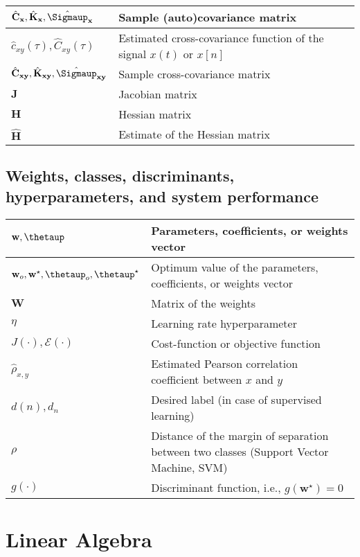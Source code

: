 \documentclass{article}
\begin{document}
\begin{xltabular}{\textwidth}{XX}
    \(\hat{\mathbf{C}}_\mathbf{x}, \hat{\mathbf{K}}_\mathbf{x}, \hat{\boldsymbol{\Sigmaup}}_\mathbf{x}\) & Sample (auto)covariance matrix \\ \hline
    \(\hat{c}_{xy}(\tau), \hat{C}_{xy}(\tau)\) & Estimated cross-covariance function of the signal \(x(t)\) or \(x[n]\)\\ \hline
    \(\hat{\mathbf{C}}_{\mathbf{xy}}, \hat{\mathbf{K}}_{\mathbf{xy}}, \hat{\boldsymbol{\Sigmaup}}_{\mathbf{xy}}\) & Sample cross-covariance matrix \\ \hline
    \(\mathbf{J}\) & Jacobian matrix\\ \hline
    \(\mathbf{H}\) & Hessian matrix \\ \hline
    \(\hat{\mathbf{H}}\) & Estimate of the Hessian matrix
\end{xltabular}

\subsection{Weights, classes, discriminants, hyperparameters, and system performance}
\begin{xltabular}{\textwidth}{XX}
    \(\mathbf{w}, \boldsymbol{\thetaup}\) & Parameters, coefficients, or weights vector \\ \hline
    \(\mathbf{w}_o, \mathbf{w}^{\star}, \boldsymbol{\thetaup}_o, \boldsymbol{\thetaup}^{\star}\) & Optimum value of the parameters, coefficients, or weights vector \\ \hline
    \(\mathbf{W}\) & Matrix of the weights \\ \hline
    \(\eta\) & Learning rate hyperparameter \\ \hline
    \(J(\cdot), \mathcal{E}(\cdot)\) & Cost-function or objective function\\ \hline
    \(\hat{\rho}_{x,y}\) & Estimated Pearson correlation coefficient between \(x\) and \(y\)\\ \hline
    \(d(n), d_n\) & Desired label (in case of supervised learning) \\ \hline
    \(\rho\) & Distance of the margin of separation between two classes (Support Vector Machine, SVM) \\ \hline
    \(g(\cdot)\) & Discriminant function, i.e., \(g(\mathbf{w}^{\star}) = 0\)
\end{xltabular}

\section{Linear Algebra}
\end{document}
